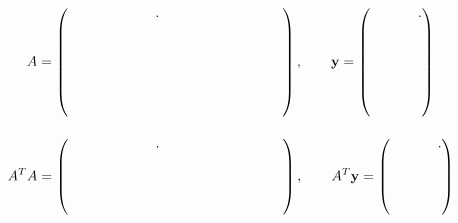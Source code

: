 \documentclass[11pt,respuestas,a4]{aleph-examen}
\begin{document}
\begin{preguntas}
\[
A=
\begin{pmatrix}
\hspace{2.2cm} . & \hspace{1.2cm} & \hspace{1.2cm} \\[0.4cm]
\hspace{1.2cm} & \hspace{1.2cm} & \hspace{1.2cm} \\[0.4cm]
\hspace{1.2cm} & \hspace{1.2cm} & \hspace{1.2cm} \\[0.4cm]
\hspace{1.2cm} & \hspace{1.2cm} & \hspace{1.2cm}
\end{pmatrix},
\qquad
\mathbf{y}=
\begin{pmatrix}
\hspace{1.2cm} .\\[0.4cm]
\hspace{1.2cm}\\[0.4cm]
\hspace{1.2cm}\\[0.4cm]
\hspace{1.2cm}
\end{pmatrix}
\]

\[
A^TA=
\begin{pmatrix}
\hspace{2.2cm} .& \hspace{1.2cm} & \hspace{1.2cm} \\[0.4cm]
\hspace{1.2cm} & \hspace{1.2cm} & \hspace{1.2cm} \\[0.4cm]
\hspace{1.2cm} & \hspace{1.2cm} & \hspace{1.2cm}
\end{pmatrix},
\qquad
A^T\mathbf{y}=
\begin{pmatrix}
\hspace{1.2cm}.\\[0.4cm]
\hspace{1.2cm}\\[0.4cm]
\hspace{1.2cm}
\end{pmatrix}
\]


\end{preguntas}
\end{document}
